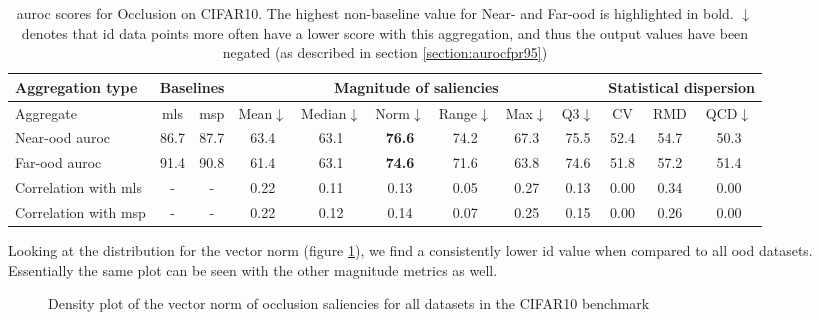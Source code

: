\documentclass[UKenglish]{uiomasterthesis} %
\theoremstyle{definition}
\begin{document}
\begin{table}[hbtp]
\setlength\tabcolsep{3pt}
\begin{center}
\begin{tabular}{ |p{5.1em}|c c|c c c c c c|c c c| }
    \hline
     \centering Aggregation type & \multicolumn{2}{c|}{Baselines} & \multicolumn{6}{c|}{Magnitude of saliencies} & \multicolumn{3}{p{8em}|}{\centering Statistical dispersion} \\
    \hline
    Aggregate & \ac{mls} & \ac{msp} & Mean$\downarrow$ & Median$\downarrow$ & Norm$\downarrow$ & Range$\downarrow$ & Max$\downarrow$ & Q3$\downarrow$ & CV & RMD & QCD$\downarrow$  \\
    \hline
    \rowcolor{near!50}
    Near-\ac{ood} \ac{auroc} & 86.7 & 87.7 & 63.4 & 63.1 &\textbf{ 76.6 }& 74.2 & 67.3 & 75.5 & 52.4 & 54.7 & 50.3  \\
    \hline
    \rowcolor{far!50}
    Far-\ac{ood} \ac{auroc} & 91.4 & 90.8 & 61.4 & 63.1 &\textbf{ 74.6 }& 71.6 & 63.8 & 74.6 & 51.8 & 57.2 & 51.4  \\
    \hline
    Correlation with \ac{mls}& - & - & 0.22 & 0.11 & 0.13 & 0.05 & 0.27 & 0.13 & 0.00 & 0.34 & 0.00  \\
    \hline
    Correlation with \ac{msp}& - & - & 0.22 & 0.12 & 0.14 & 0.07 & 0.25 & 0.15 & 0.00 & 0.26 & 0.00  \\
    \hline
    \end{tabular}
    \caption[\ac{auroc} scores for Occlusion on CIFAR10]{\ac{auroc} scores for Occlusion on CIFAR10. The highest non-baseline value for Near- and Far-\ac{ood} is highlighted in bold. $\downarrow$ denotes that \ac{id} data points more often have a lower score with this aggregation, and thus the output values have been negated (as described in section \ref{section:aurocfpr95})}
    \label{table:cifar10_occlusion_metrics}
\end{center}
\setlength\tabcolsep{6pt}
\end{table}

Looking at the distribution for the vector norm (figure \ref{fig:cifar10_occlusion_norm}), we find a consistently lower \ac{id} value when compared to all \ac{ood} datasets. Essentially the same plot can be seen with the other magnitude metrics as well.

\begin{figure}[hbtp]
    \begin{center}
        
    \end{center}
    \caption[CIFAR10 occlusion vector norm density plot]{Density plot of the vector norm of occlusion saliencies for all datasets in the CIFAR10 benchmark}
    \label{fig:cifar10_occlusion_norm}
\end{figure}
\end{document}

